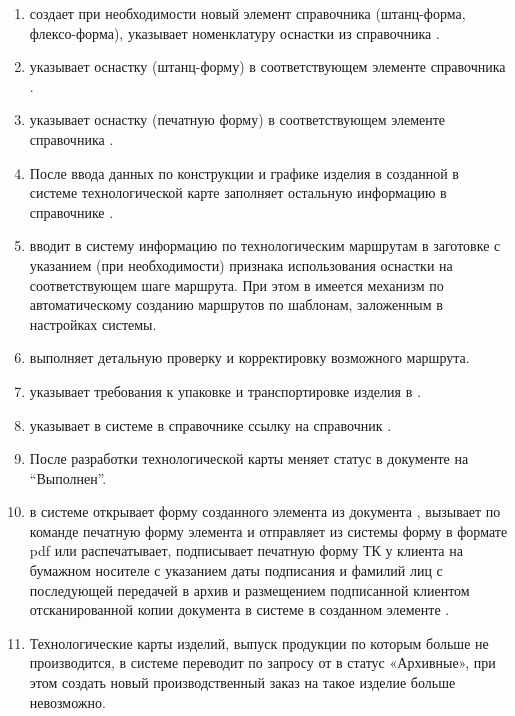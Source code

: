 \begin{enumerate}
\item	\tehnolog  создает при необходимости новый элемент справочника  (штанц-форма, флексо-форма), указывает номенклатуру оснастки из справочника . 
\item	\tehnolog  указывает оснастку (штанц-форму) в соответствующем элементе справочника . 
\item \tehnolog  указывает оснастку (печатную форму) в соответствующем элементе справочника .
\item	После ввода данных по конструкции и графике изделия в созданной в системе \gofro технологической карте \tehnolog заполняет остальную информацию в справочнике .
\item	\tehnolog  вводит в систему \gofro информацию по технологическим маршрутам в заготовке   с указанием (при необходимости) признака использования оснастки на соответствующем шаге маршрута. При этом в \gofro имеется механизм по автоматическому созданию маршрутов по шаблонам, заложенным в настройках системы.

\item	\tehnolog выполняет детальную проверку и корректировку возможного маршрута.
\item	\tehnolog указывает требования к упаковке и транспортировке изделия в .
\item	\tehnolog указывает в системе \gofro в справочнике  ссылку на справочник .
\item	После разработки технологической карты \tehnolog меняет статус в документе  на “Выполнен”. 
\item	\manager в системе \gofro открывает форму созданного элемента  из документа , вызывает по команде  печатную форму элемента  и отправляет из системы \gofro форму в формате pdf или распечатывает, подписывает печатную форму ТК у клиента на бумажном носителе с указанием даты подписания и фамилий лиц с последующей передачей в архив и размещением подписанной клиентом отсканированной копии документа в системе \gofro в созданном элементе .

\item	Технологические карты изделий, выпуск продукции по которым больше не производится,  \tehnolog в системе \gofro переводит по запросу от \manager в статус «Архивные», при этом создать новый производственный заказ на такое изделие больше невозможно.

\end{enumerate}





